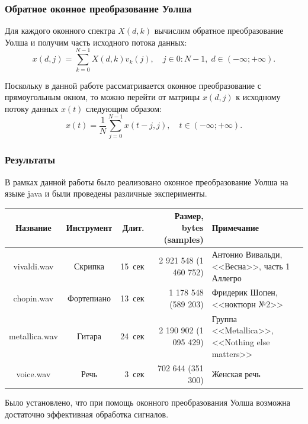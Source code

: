 \documentclass[notes=only]{beamer}
\begin{document}
  
\begin{frame}\frametitle{Обратное оконное преобразование Уолша}
Для каждого оконного спектра $X(d, k)$ вычислим обратное преобразование
Уолша и получим часть исходного потока данных:
\[
x(d,j) = \sum_{k=0}^{N-1} X(d,k) \hat{v}_k(j),
\quad j \in 0:N-1, \; d \in (-\infty; +\infty).
\]

Поскольку в данной работе рассматривается оконное преобразование
с прямоугольным окном, то
можно перейти от матрицы $x(d,j)$ к исходному потоку данных $x(t)$ следующим образом:
\begin{equation}
 x(t) = \frac{1}{N} \sum_{j=0}^{N-1} x(t-j,j), \quad t \in (-\infty; +\infty).
\end{equation}

\end{frame}

  
\begin{frame}\frametitle{Результаты}
В рамках данной работы было реализовано оконное преобразование Уолша на языке java
и были проведены различные эксперименты. 

\begin{table}
  \centering
    \resizebox{\textwidth}{!} {
    \begin{tabular}{ | c | c | r | r | p{4.5cm} |}
    \hline
    Название & Инструмент & Длит. & Размер, bytes (samples) & Примечание \\ \hline
    vivaldi.wav & Скрипка & 15~сек & 2 921 548 (1 460 752) & Антонио Вивальди, <<Весна>>, часть 1 Аллегро \\ \hline
    chopin.wav & Фортепиано & 13~сек & 1 178 548 (589 203) & Фридерик Шопен, <<ноктюрн №2>> \\ \hline
    metallica.wav & Гитара & 24~сек & 2 190 902 (1 095 429) & Группа <<Metallica>>, <<Nothing else matters>> \\ \hline
    voice.wav & Речь & 3~сек & 702 644 (351 300) & Женская речь \\ \hline
    \end{tabular}}
\end{table}

Было установлено, что при помощь оконного преобразования Уолша возможна
достаточно эффективная обработка сигналов.

\end{frame}
    
\end{document}
